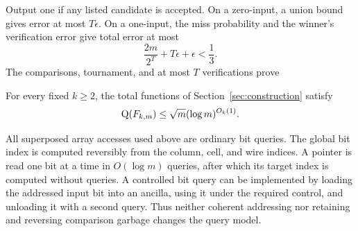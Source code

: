 Output one if any listed candidate is accepted. On a zero-input, a
union bound gives error at most $T\epsilon$. On a one-input, the miss
probability and the winner's verification error give total error at most
\[
 \frac{2m}{2^T}+T\epsilon+\epsilon<\frac13.
\]
The comparisons, tournament, and at most $T$ verifications prove
\begin{proposition}\label{prop:quantum}
For every fixed $k\ge2$, the total functions of
Section~\ref{sec:construction} satisfy
\[
 \mathrm Q(F_{k,m})\le\sqrt m(\log m)^{O_k(1)}.
\]
\end{proposition}

All superposed array accesses used above are ordinary bit queries.
The global bit index is computed reversibly from the column, cell, and
wire indices. A pointer is read one bit at a time in $O(\log m)$ queries,
after which its target index is computed without queries. A controlled
bit query can be implemented by loading the addressed input bit into
an ancilla, using it under the required control, and unloading it with
a second query. Thus neither coherent addressing nor retaining and
reversing comparison garbage changes the query model.
